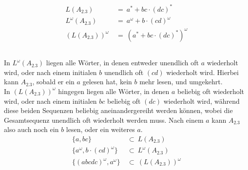 \documentclass[12pt,a4paper]{../krautsourcing/homework}
\author{Ruben Felgenhauer,\\Alexander Hildebrandt,\\Leonhard Reichenbach}
\begin{document}
\makeheadline

\addtocounter{section}{2}

\section{}

\subsection{}

\begin{align*}
L(A_{2.3})          \ &=\ a^* + b c \cdot (d c)^* \\
L^\omega(A_{2.3})   \ &=\  a^\omega + b \cdot (c d)^\omega \\
(L(A_{2.3}))^\omega \ &=\ (a^* + b c \cdot (d c)^*)^\omega
\end{align*}

\subsection{}

In \(L^\omega(A_{2.3})\) liegen alle Wörter, in denen entweder unendlich oft \(a\) wiederholt wird, oder nach einem initialen \(b\) unendlich oft \((cd)\) wiederholt wird. Hierbei kann \(A_{2.3}\), sobald er ein \(a\) gelesen hat, kein \(b\) mehr lesen, und umgekehrt. \\
In \((L(A_{2.3}))^\omega\) hingegen liegen alle Wörter, in denen \(a\) beliebig oft wiederholt wird, oder nach einem initialen \(bc\) beliebig oft \((dc)\) wiederholt wird, während diese beiden Sequenzen beliebig aneinandergereiht werden können, wobei die Gesamtsequenz unendlich oft wiederholt werden muss. Nach einem \(a\) kann \(A_{2.3}\) also auch noch ein \(b\) lesen, oder ein weiteres \(a\).
\begin{align*}
\{a, b c\}   \ &\subset\ L(A_{2.3}) \\
\{a^\omega, b \cdot (cd)^\omega\}  \ &\subset\ L^\omega(A_{2.3}) \\
\{(abcdc)^\omega, a^\omega\} \ &\subset\ (L(A_{2.3}))^\omega \\
\end{align*}
\end{document}
